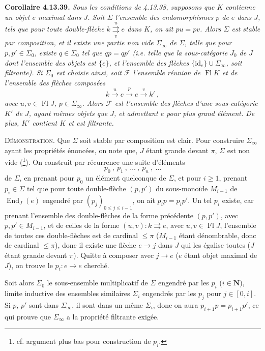\documentclass[11pt]{article}
\newcommand{\printedpage}[1]{\marginpar{\footnotesize p.~#1}}
\newcommand{\msp}[1]{\marginpar{\footnotesize [#1]}}
\newcommand{\Fl}{\operatorname{Fl}}
\newcommand{\End}{\operatorname{End}}
\newcommand{\id}{\mathrm{id}}
\begin{document}
\printedpage{139}

\noindent\textbf{Corollaire 4.13.39.} {\itshape Sous les conditions de 4.13.38, supposons que $K$ contienne un objet $e$ maximal dans $J$. Soit $\Sigma$ l'ensemble des endomorphismes $p$ de $e$ dans $J$, tels que pour toute double-flèche $k \overset{u}{\underset{v}{\rightrightarrows}} e$ \textup{dans} $K$, on ait $pu=pv$. Alors $\Sigma$ est stable par composition, et il existe une partie non vide $\Sigma_\infty$ de $\Sigma$, telle que pour $p,p'\in\Sigma_0$, existe
\msp{page 367}
$q\in\Sigma_0$ tel que $qp=qp'$ (i.e. telle que la sous-catégorie $J_0$ de $J$ dont l'ensemble des objets est $\{e\}$, et l'ensemble des flèches $\{\id_e\}\cup\Sigma_\infty$, soit filtrante). Si $\Sigma_0$ est choisie ainsi, soit $\mathcal{F}$ l'ensemble réunion de $\Fl K$ et de l'ensemble des flèches composées
\[
k \xrightarrow{\ u\ } e \xrightarrow{\ p\ } e \xrightarrow{\ v\ } k'\ , \tag*{$(*)$}
\]
avec $u,v\in\Fl J$, $p\in\Sigma_\infty$. Alors $\mathcal{F}$ est l'ensemble des flèches d'une sous-catégorie $K'$ de $J$, ayant mêmes objets que $J$, et admettant $e$ pour plus grand élément. De plus, $K'$ contient $K$ et est filtrante.}

\noindent\textsc{Démonstration}. Que $\Sigma$ soit stable par composition est clair. Pour construire $\Sigma_\infty$ ayant les propriétés énoncées, on note que, $J$ étant grande devant $\pi$, $\Sigma$ est non vide (\footnote[162]{cf. argument plus bas pour construction de $p_i$.}). On construit par récurrence une suite d'éléments
\[
p_0\ ,\ p_1\ ,\ \ldots\ ,\ p_n\ ,\ \ldots
\]
de $\Sigma$, en prenant pour $p_0$ un élément quelconque de $\Sigma$, et pour $i\geqslant 1$, prenant $p_i\in\Sigma$ tel que pour toute double-flèche $(p,p')$ du sous-monoïde $M_{i-1}$ de $\End_J(e)$ engendré par $(p_j)_{0\leqslant j\leqslant i-1}$, on ait $p_ip=p_ip'$. Un tel $p_i$ existe, car prenant l'ensemble des double-flèches de la forme précédente $(p,p')$, avec $p,p'\in M_{i-1}$, et de celles de la forme $(u,v) : k \rightrightarrows e$, avec $u,v\in\Fl J$, l'ensemble de
\msp{page 368}
toutes ces double-flèches est de cardinal $\leqslant\pi$ ($M_{i-1}$ étant dénombrable, donc de cardinal $\leqslant\pi$), donc il existe une flèche $e\longrightarrow j$ dans $J$ qui les égalise toutes ($J$ étant grande devant $\pi$). Quitte à composer avec $j\longrightarrow e$ ($e$ étant objet maximal de $J$), on trouve le $p_i : e\longrightarrow e$ cherché.

Soit alors $\Sigma_0$ le sous-ensemble multiplicatif de $\Sigma$ engendré par les $p_i$ ($i\in\mathbf{N}$), limite inductive des ensembles similaires $\Sigma_i$ engendrés par les $p_j$ pour $j\in[0,i]$. Si $p$, $p'$ sont dans $\Sigma_\infty$, il sont dans un même $\Sigma_i$, donc on aura $p_{i+1}p=p_{i+1}p'$, ce qui prouve que $\Sigma_\infty$ a la propriété filtrante exigée. %
\end{document}
